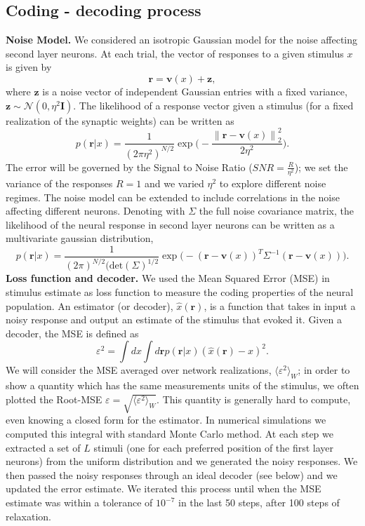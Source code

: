 \documentclass[a4paper]{article}
\begin{document}
\subsection{Coding - decoding process}
\textbf{Noise Model.} We considered an isotropic Gaussian model for the noise affecting second layer neurons. At each trial, the vector of responses to a given stimulus $x$ is given by
\begin{equation}
\mathbf{r} = \mathbf{v}(x) + \mathbf{z },
\label{Eq:r}
\end{equation}where $\mathbf{z}$ is a noise vector of independent Gaussian entries with a fixed variance, $\mathbf{z} \sim \mathcal{N}(0,\eta^2\mathbf{I})$. The likelihood of a response vector given a stimulus (for a fixed realization of the synaptic weights) can be written as
\begin{equation}
p(\mathbf{r}|x) = \frac{1}{(2\pi\eta^2)^{N/2}} \exp\Big(- \frac{\left\lVert \mathbf{r}-\mathbf{v}(x)\right\rVert_2^2}{2\eta^2} \Big).
\label{Eq:L}
\end{equation}
The error will be governed by the Signal to Noise Ratio ($SNR= \frac{R}{\eta^2}$); we set the variance of the responses $R=1$ and we varied $\eta^2$ to explore different noise regimes.
The noise model can be extended to include correlations in the noise affecting different neurons. Denoting with $\Sigma$ the full noise covariance matrix, the likelihood of the neural response in second layer neurons can be written as a multivariate gaussian distribution,
\begin{equation}
p(\mathbf{r}|x) = \frac{1}{(2\pi )^{N/2}(\text{det}(\Sigma)^{1/2}} \exp\Big(-(\mathbf{r} - \mathbf{v}(x))^T\Sigma^{-1}(\mathbf{r} - \mathbf{v}(x)) \Big).
\label{Eq:LIn}
\end{equation}
\newline
\newline
\textbf{Loss function and decoder.} We used the Mean Squared Error (MSE) in stimulus estimate as loss function to measure the coding properties of the neural population. An estimator (or decoder), $\hat{x}(\mathbf{r})$, is a function that takes in input a noisy response and output an estimate of the stimulus that evoked it. Given a decoder, the MSE is defined as
\begin{equation}
\varepsilon^2 = \int dx \int d\mathbf{r} p(\mathbf{r}|x) (\hat{x}(\mathbf{r}) -x)^2.
\label{Eq:MSE}
\end{equation}We will consider the  MSE averaged over network realizations, $\langle \varepsilon^2\rangle_W$; in order to show a quantity which has the same measurements units of the stimulus, we often plotted the Root-MSE $ \varepsilon = \sqrt{\langle \varepsilon^2\rangle_W}$.
This quantity is generally hard to compute, even knowing a closed form for the estimator.  In numerical simulations we computed this integral with standard Monte Carlo method. At each step we extracted a set of $L$ stimuli (one for each preferred position of the first layer neurons) from the uniform distribution and we generated the noisy responses. We then passed the noisy responses through an ideal decoder (see below) and we updated the error estimate. We iterated this process until when the MSE estimate was within a tolerance of $10^{-7}$ in the last 50 steps, after 100 steps of relaxation.
\end{document}

